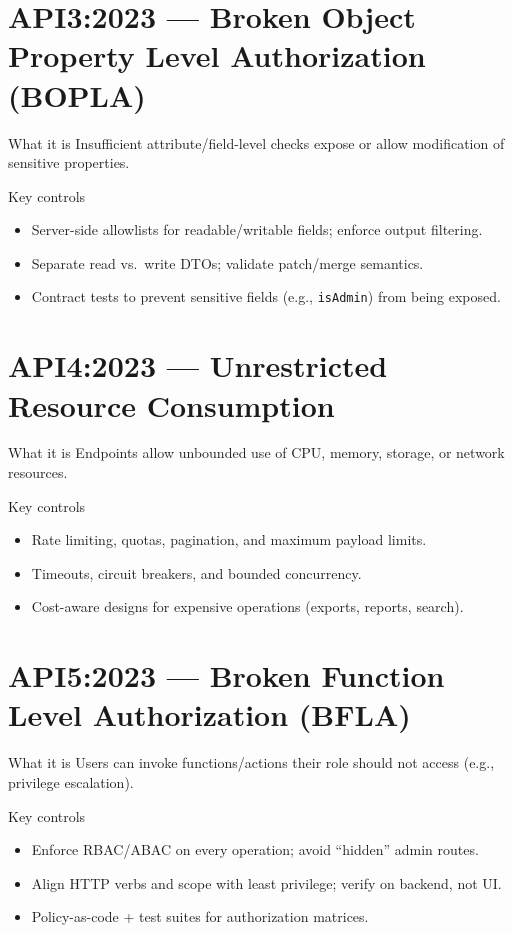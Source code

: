 \documentclass[11pt,a4paper]{article}
\begin{document}
\section{API3:2023 — Broken Object Property Level Authorization (BOPLA)}
\begin{callout}{What it is}
Insufficient attribute/field\mbox{-}level checks expose or allow modification of sensitive properties.
\end{callout}
\begin{callout}{Key controls}
\begin{itemize}
  \item Server\mbox{-}side allowlists for readable/writable fields; enforce output filtering.
  \item Separate read vs.\ write DTOs; validate patch/merge semantics.
  \item Contract tests to prevent sensitive fields (e.g., \texttt{isAdmin}) from being exposed.
\end{itemize}
\end{callout}

\section{API4:2023 — Unrestricted Resource Consumption}
\begin{callout}{What it is}
Endpoints allow unbounded use of CPU, memory, storage, or network resources.
\end{callout}
\begin{callout}{Key controls}
\begin{itemize}
  \item Rate limiting, quotas, pagination, and maximum payload limits.
  \item Timeouts, circuit breakers, and bounded concurrency.
  \item Cost\mbox{-}aware designs for expensive operations (exports, reports, search).
\end{itemize}
\end{callout}

\section{API5:2023 — Broken Function Level Authorization (BFLA)}
\begin{callout}{What it is}
Users can invoke functions/actions their role should not access (e.g., privilege escalation).
\end{callout}
\begin{callout}{Key controls}
\begin{itemize}
  \item Enforce RBAC/ABAC on every operation; avoid “hidden” admin routes.
  \item Align HTTP verbs and scope with least privilege; verify on backend, not UI.
  \item Policy\mbox{-}as\mbox{-}code + test suites for authorization matrices.
\end{itemize}
\end{callout}
\end{document}
